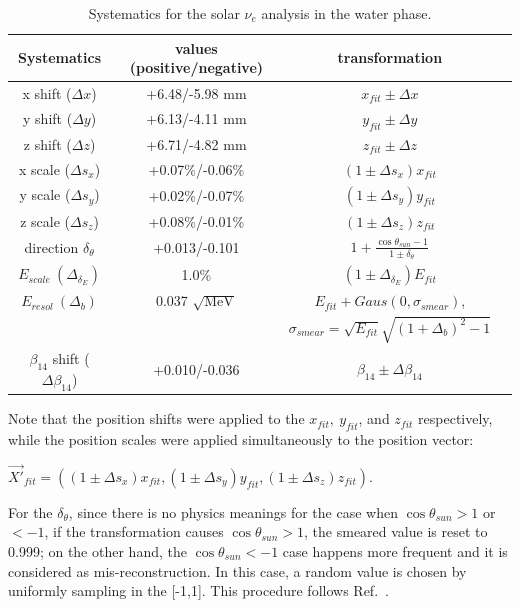 \begin{table}[ht]
	\centering
	\caption{Systematics for the solar $\nu_e$ analysis in the water phase.}
	\label{tab:solar_uncertainties}
	\begin{tabular*}{150mm}{c@{\extracolsep{\fill}}ccc}
		\toprule
		Systematics & values (positive/negative) & transformation   \\
		\hline
		x shift ($\Delta x$) & +6.48/-5.98 mm  & $x_{fit}\pm \Delta x$ \\	
		y shift ($\Delta y$)& +6.13/-4.11 mm   & $y_{fit}\pm \Delta y$ \\
		z shift ($\Delta z$)& +6.71/-4.82 mm   & $z_{fit}\pm \Delta z$ \\
		x scale ($\Delta s_x$)& +0.07\%/-0.06\%  & $(1\pm \Delta s_x)x_{fit}$\\	
		y scale ($\Delta s_y$)& +0.02\%/-0.07\%  & $(1\pm \Delta s_y)y_{fit}$ \\
		z scale ($\Delta s_z$)& +0.08\%/-0.01\%  & $(1\pm \Delta s_z)z_{fit}$ \\
		direction $\delta_\theta$  & +0.013/-0.101 & $1+\frac{\cos\theta_{sun}-1}{1\pm\delta_\theta}$\\
		$E_{scale}~(\Delta_{\delta_E})$ &  1.0\%  & $(1\pm \Delta_{\delta_E})E_{fit}$\\
		$E_{resol}~(\Delta_b)$ &  0.037 $\sqrt{\mathrm{MeV}}$  & $E_{fit}+Gaus(0,\sigma_{smear})$, \\
		& &$\sigma_{smear}=\sqrt{E_{fit}}\sqrt{(1+\Delta_b)^2-1}$\\
		$\beta_{14}$ shift ($\Delta \beta_{14}$) & +0.010/-0.036 & $\beta_{14}\pm \Delta \beta_{14}$\\
		\bottomrule
	\end{tabular*}
\end{table}

Note that the position shifts were applied to the $x_{fit},~y_{fit}$, and $z_{fit}$ respectively, while the position scales were applied simultaneously to the position vector: 

$\vec{X'}_{fit}=((1\pm \Delta s_x)x_{fit},(1\pm \Delta s_y)y_{fit},(1\pm \Delta s_z)z_{fit})$.

For the $\delta_\theta$, since there is no physics meanings for the case when $\cos\theta_{sun}>1$ or $<-1$, if the transformation causes $\cos\theta_{sun}>1$, the smeared value is reset to 0.999; on the other hand, the $\cos\theta_{sun}<-1$ case happens more frequent and it is considered as mis-reconstruction. In this case, a random value is chosen by uniformly sampling in the [-1,1]. This procedure follows Ref.~\cite{waterunidoc}.

